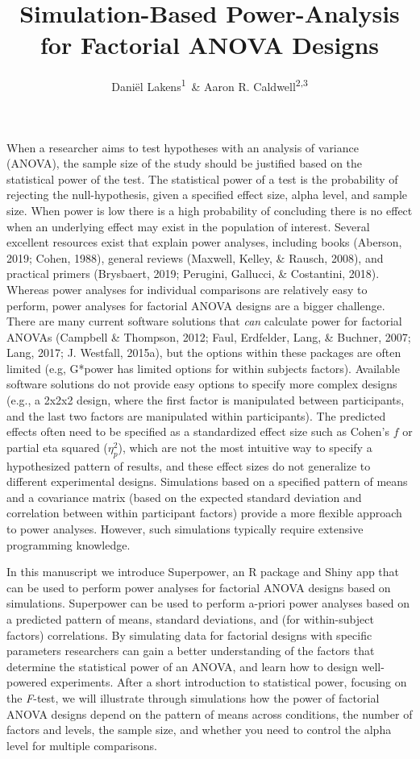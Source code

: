 \documentclass[,man,floatsintext]{apa6}
\title{Simulation-Based Power-Analysis for Factorial ANOVA Designs}
\author{Daniël Lakens\textsuperscript{1}~\& Aaron R. Caldwell\textsuperscript{2,3}}
\date{}
\affiliation{
\vspace{0.5cm}
\textsuperscript{1} Human-Technology Interaction Group, Eindhoven University of Technology, The Netherlands\\\textsuperscript{2} Department of Health, Human Performance and Recreation, University of Arkansas, USA\\\textsuperscript{3} Thermal and Mountain Medicine Division, U.S. Army Research Institute of Environmental Medicine, USA}
\begin{document}
\maketitle

When a researcher aims to test hypotheses with an analysis of variance (ANOVA), the sample size of the study should be justified based on the statistical power of the test.
The statistical power of a test is the probability of rejecting the null-hypothesis, given a specified effect size, alpha level, and sample size.
When power is low there is a high probability of concluding there is no effect when an underlying effect may exist in the population of interest.
Several excellent resources exist that explain power analyses, including books (Aberson, 2019; Cohen, 1988), general reviews (Maxwell, Kelley, \& Rausch, 2008), and practical primers (Brysbaert, 2019; Perugini, Gallucci, \& Costantini, 2018).
Whereas power analyses for individual comparisons are relatively easy to perform, power analyses for factorial ANOVA designs are a bigger challenge. There are many current software solutions that \emph{can} calculate power for factorial ANOVAs (Campbell \& Thompson, 2012; Faul, Erdfelder, Lang, \& Buchner, 2007; Lang, 2017; J. Westfall, 2015a), but the options within these packages are often limited (e.g, G*power has limited options for within subjects factors).
Available software solutions do not provide easy options to specify more complex designs (e.g., a 2x2x2 design, where the first factor is manipulated between participants, and the last two factors are manipulated within participants).
The predicted effects often need to be specified as a standardized effect size such as Cohen's \(f\) or partial eta squared (\(\eta_p^2\)), which are not the most intuitive way to specify a hypothesized pattern of results, and these effect sizes do not generalize to different experimental designs.
Simulations based on a specified pattern of means and a covariance matrix (based on the expected standard deviation and correlation between within participant factors) provide a more flexible approach to power analyses.
However, such simulations typically require extensive programming knowledge.

In this manuscript we introduce Superpower, an R package and Shiny app that can be used to perform power analyses for factorial ANOVA designs based on simulations.
Superpower can be used to perform a-priori power analyses based on a predicted pattern of means, standard deviations, and (for within-subject factors) correlations.
By simulating data for factorial designs with specific parameters researchers can gain a better understanding of the factors that determine the statistical power of an ANOVA, and learn how to design well-powered experiments.
After a short introduction to statistical power, focusing on the \emph{F}-test, we will illustrate through simulations how the power of factorial ANOVA designs depend on the pattern of means across conditions, the number of factors and levels, the sample size, and whether you need to control the alpha level for multiple comparisons.
\end{document}
